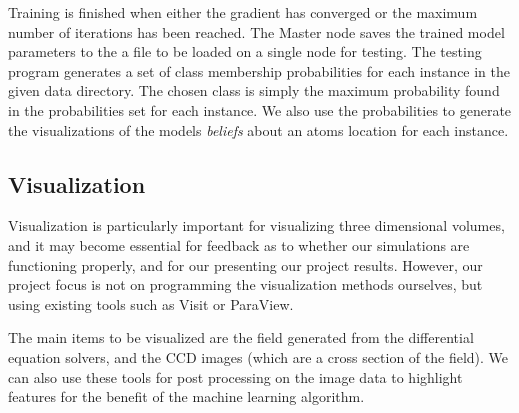 Training is finished when either the gradient has converged or the maximum number of iterations has been reached.  The Master node saves the trained model parameters to the a file to be loaded on a single node for testing.  The testing program generates a set of class membership probabilities for each instance in the given data directory.  The chosen class is simply the maximum probability found in the probabilities set for each instance.  We also use the probabilities to generate the visualizations of the models \emph{beliefs} about an atoms location for each instance.

\subsection{Visualization}
Visualization is particularly important for visualizing three dimensional volumes, and it may become essential for feedback as to whether our simulations are functioning properly, and for our presenting our project results. However, our project focus is not on programming the visualization methods ourselves, but using existing tools such as Visit or ParaView.

The main items to be visualized are the field generated from the differential equation solvers, and the CCD images (which are a cross section of the field). We can also use these tools for post processing on the image data to highlight features for the benefit of the machine learning algorithm.
